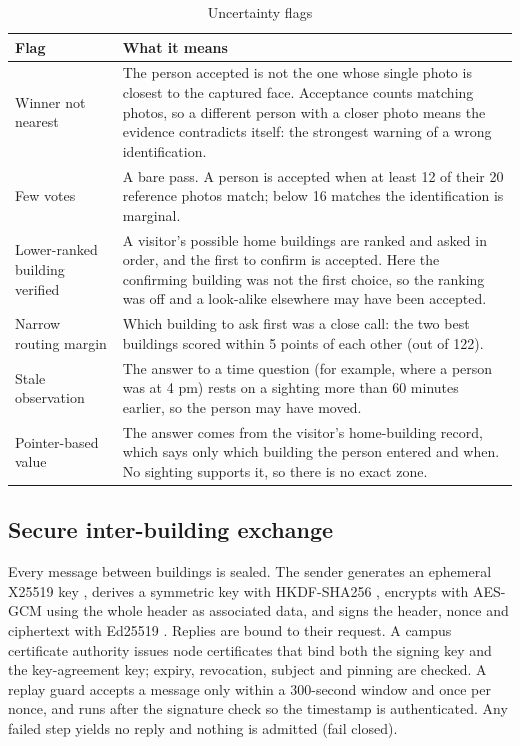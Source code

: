 \documentclass[12pt,a4paper,oneside]{report}
\begin{document}
\begin{table}[htbp]
\centering
\caption{Uncertainty flags}\label{tab:flags}
{\footnotesize\setlength{\tabcolsep}{4pt}\renewcommand{\arraystretch}{1.2}
\begin{tabular}{|p{3.6cm}|p{10.98cm}|}\hline
\textbf{Flag} & \textbf{What it means}\\\hline
Winner not nearest & The person accepted is not the one whose single photo is closest to the captured face. Acceptance counts matching photos, so a different person with a closer photo means the evidence contradicts itself: the strongest warning of a wrong identification.\\\hline
Few votes & A bare pass. A person is accepted when at least 12 of their 20 reference photos match; below 16 matches the identification is marginal.\\\hline
Lower-ranked building verified & A visitor's possible home buildings are ranked and asked in order, and the first to confirm is accepted. Here the confirming building was not the first choice, so the ranking was off and a look-alike elsewhere may have been accepted.\\\hline
Narrow routing margin & Which building to ask first was a close call: the two best buildings scored within 5 points of each other (out of 122).\\\hline
Stale observation & The answer to a time question (for example, where a person was at 4 pm) rests on a sighting more than 60 minutes earlier, so the person may have moved.\\\hline
Pointer-based value & The answer comes from the visitor's home-building record, which says only which building the person entered and when. No sighting supports it, so there is no exact zone.\\\hline
\end{tabular}}
\end{table}

\subsection{Secure inter-building exchange}
Every message between buildings is sealed. The sender generates an ephemeral X25519 key \cite{ref23}, derives a symmetric key with HKDF-SHA256 \cite{ref22}, encrypts with AES-GCM \cite{ref25} using the whole header as associated data, and signs the header, nonce and ciphertext with Ed25519 \cite{ref24}. Replies are bound to their request. A campus certificate authority issues node certificates that bind both the signing key and the key-agreement key; expiry, revocation, subject and pinning are checked. A replay guard accepts a message only within a 300-second window and once per nonce, and runs after the signature check so the timestamp is authenticated. Any failed step yields no reply and nothing is admitted (fail closed).
\end{document}
